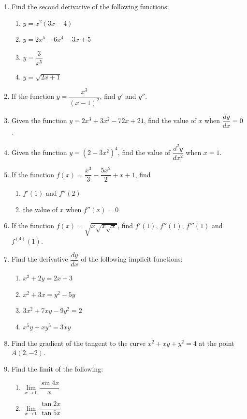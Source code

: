 \documentclass[12pt]{report}
\begin{document}
\begin{enumerate}
  \item Find the second derivative of the following functions:
        \begin{enumerate}
          \item $y=x^{2}(3x-4)$
          \item $y=2x^{5}-6x^{4}-3x+5$
          \item $y={\dfrac{3}{x^{5}}}$
          \item $y={\sqrt{2x+1}}$
        \end{enumerate}

  \item If the function $y = \dfrac{x^3}{{(x-1)}^2}$, find $y'$ and $y''$.
  \item Given the function $y = 2x^3 + 3x^2 - 72x + 21$, find the value of $x$ when
        $\dfrac{dy}{dx} = 0$.
  \item Given the function $y = {(2-3x^2)}^4$, find the value of $\dfrac{d^2y}{dx^2}$
        when $x = 1$.
  \item If the function $f (x) = \dfrac{x^3}{3} - \dfrac{5x^2}{2} + x + 1$, find
        \begin{enumerate}
          \item $f' (1)$ and $f'' (2)$
          \item the value of $x$ when $f'' (x) = 0$
        \end{enumerate}
  \item If the function $f (x) = \sqrt{x\sqrt{x\sqrt{x}}}$, find $f' (1)$, $f'' (1)$,
        $f''' (1)$ and $f^{(4)}(1)$.
  \item Find the derivative $\dfrac{dy}{dx}$ of the following implicit functions:
        \begin{enumerate}
          \item $x^{2}+2y=2x+3$
          \item $x^{2}+3x=y^{2}-5y$
          \item $3x^{2}+7x y-9y^{2}=2$
          \item $x^{5}y+x y^{5}=3x y$
        \end{enumerate}
  \item Find the gradient of the tangent to the curve $x^2 + xy + y^2 = 4$ at the point
        $A(2, -2)$.
  \item Find the limit of the following:
        \begin{enumerate}
          \item $\lim\limits_{x\to0}{\dfrac{\sin{4x}}{x}}$
          \item $\lim\limits_{x\to0}{\dfrac{\tan2x}{\tan5x}}$

\end{enumerate}
\end{enumerate}
\end{document}
